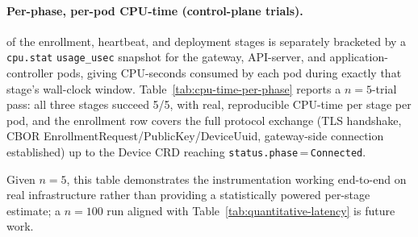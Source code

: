 \paragraph{Per-phase, per-pod CPU-time (control-plane trials).} %
 of the enrollment, heartbeat, and deployment stages is separately bracketed by a \texttt{cpu.stat} \texttt{usage\_usec} snapshot for the gateway, API-server, and application-controller pods, giving CPU-seconds consumed by each pod during exactly that stage's wall-clock window. %
 Table~\ref{tab:cpu-time-per-phase} reports a $n{=}5$-trial pass: all three stages succeed 5/5, with real, reproducible CPU-time per stage per pod, and the enrollment row covers the full protocol exchange (TLS handshake, CBOR EnrollmentRequest/PublicKey/DeviceUuid, gateway-side connection established) up to the Device CRD reaching \texttt{status.phase}\,=\,\texttt{Connected}.

Given $n{=}5$, this table demonstrates the instrumentation working end-to-end on real infrastructure rather than providing a statistically powered per-stage estimate; a $n{=}100$ run aligned with Table~\ref{tab:quantitative-latency} is future work.

